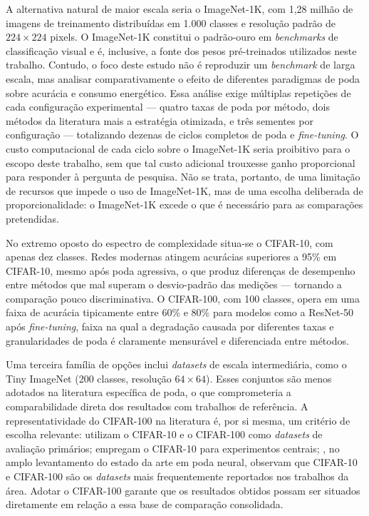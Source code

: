 A alternativa natural de maior escala seria o ImageNet-1K, com 1,28 milhão de imagens de treinamento distribuídas em 1.000 classes e resolução padrão de $224 \times 224$ pixels. O ImageNet-1K constitui o padrão-ouro em \textit{benchmarks} de classificação visual e é, inclusive, a fonte dos pesos pré-treinados utilizados neste trabalho. Contudo, o foco deste estudo não é reproduzir um \textit{benchmark} de larga escala, mas analisar comparativamente o efeito de diferentes paradigmas de poda sobre acurácia e consumo energético. Essa análise exige múltiplas repetições de cada configuração experimental --- quatro taxas de poda por método, dois métodos da literatura mais a estratégia otimizada, e três sementes por configuração --- totalizando dezenas de ciclos completos de poda e \textit{fine-tuning}. O custo computacional de cada ciclo sobre o ImageNet-1K seria proibitivo para o escopo deste trabalho, sem que tal custo adicional trouxesse ganho proporcional para responder à pergunta de pesquisa. Não se trata, portanto, de uma limitação de recursos que impede o uso de ImageNet-1K, mas de uma escolha deliberada de proporcionalidade: o ImageNet-1K excede o que é necessário para as comparações pretendidas.

No extremo oposto do espectro de complexidade situa-se o CIFAR-10, com apenas dez classes. Redes modernas atingem acurácias superiores a 95\% em CIFAR-10, mesmo após poda agressiva, o que produz diferenças de desempenho entre métodos que mal superam o desvio-padrão das medições --- tornando a comparação pouco discriminativa. O CIFAR-100, com 100 classes, opera em uma faixa de acurácia tipicamente entre 60\% e 80\% para modelos como a ResNet-50 após \textit{fine-tuning}, faixa na qual a degradação causada por diferentes taxas e granularidades de poda é claramente mensurável e diferenciada entre métodos.

Uma terceira família de opções inclui \textit{datasets} de escala intermediária, como o Tiny ImageNet (200 classes, resolução $64 \times 64$). Esses conjuntos são menos adotados na literatura específica de poda, o que comprometeria a comparabilidade direta dos resultados com trabalhos de referência. A representatividade do CIFAR-100 na literatura é, por si mesma, um critério de escolha relevante:  utilizam o CIFAR-10 e o CIFAR-100 como \textit{datasets} de avaliação primários;  empregam o CIFAR-10 para experimentos centrais; , no amplo levantamento do estado da arte em poda neural, observam que CIFAR-10 e CIFAR-100 são os \textit{datasets} mais frequentemente reportados nos trabalhos da área. Adotar o CIFAR-100 garante que os resultados obtidos possam ser situados diretamente em relação a essa base de comparação consolidada.

